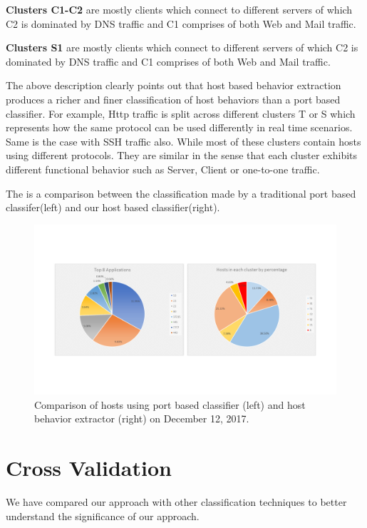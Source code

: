 \textbf{Clusters C1-C2} are mostly clients which connect to different servers of which C2 is dominated by DNS traffic and C1 comprises of both Web and Mail traffic.

\textbf{Clusters S1} are mostly clients which connect to different servers of which C2 is dominated by DNS traffic and C1 comprises of both Web and Mail traffic.

The above description clearly points out that host based behavior extraction produces a richer and finer classification of host behaviors than a port based classifier. For example, Http traffic is split across different clusters T or S which represents how the same protocol can be used differently in real time scenarios. Same is the case with SSH traffic also. While most of these clusters contain hosts using different protocols. They are similar in the sense that each cluster exhibits different functional behavior such as Server, Client or one-to-one traffic.

The  is a comparison between the classification made by a traditional port based classifer(left) and our host based classifier(right).

\begin{figure}[t]
	\centerline{\includegraphics[trim=2cm 2cm 2cm 2cm, scale = 0.5]{dec12-port-behaviors.pdf}}
	\caption{Comparison of hosts using port based classifier (left) and host behavior extractor (right) on December 12, 2017.}%
\end{figure}


\section{Cross Validation}
We have compared our approach with other classification techniques to better understand the significance of our approach.


